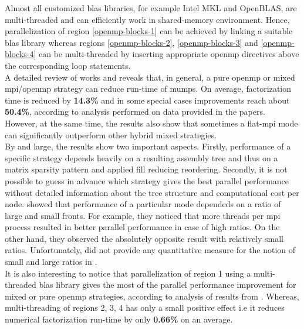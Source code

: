 Almost all customized \acrshort{blas} libraries, for example Intel MKL and OpenBLAS, are multi-threaded and can efficiently work in shared-memory environment. Hence, parallelization of region \ref{openmp-blocks-1} can be achieved by linking a suitable \acrshort{blas} library whereas regions \ref{openmp-blocks-2}, \ref{openmp-blocks-3} and \ref{openmp-blocks-4} can be multi-threaded by inserting appropriate \acrshort{openmp} directives above the corresponding loop statements.\\


A detailed review of works \cite{l2013introduction} and \cite{chowdhury2010some} reveals that, in general, a pure \acrshort{openmp} or mixed \acrshort{mpi}/\acrshort{openmp} strategy can reduce run-time of \acrshort{mumps}. On average, factorization time is reduced by \textbf{14.3\%} and in some special cases improvements reach about \textbf{50.4\%}, according to analysis performed on data provided in the papers. However, at the same time, the results also show that sometimes a flat-\acrshort{mpi} mode can significantly outperform other hybrid mixed strategies.\\


By and large, the results show two important aspects. Firstly, performance of a specific strategy depends heavily on a resulting assembly tree and thus on a matrix sparsity pattern and applied fill reducing reordering. Secondly, it is not possible to guess in advance which strategy gives the best parallel performance without detailed information about the tree structure and computational cost per node. \citeauthor{l2013introduction} showed that performance of a particular mode dependeds on a ratio of large and small fronts. For example, they noticed that more threads per \acrshort{mpi} process resulted in better parallel performance in case of high ratios. On the other hand, they observed the absolutely opposite result with relatively small ratios. Unfortunately, \citeauthor{l2013introduction} did not provide any quantitative measure for the notion of small and large ratios in  \cite{l2013introduction}.\\ 


It is also interesting to notice that parallelization of region 1 using a multi-threaded \acrshort{blas} library gives the most of the parallel performance improvement for mixed or pure \acrshort{openmp} strategies, according to analysis of results from \cite{l2013introduction}. Whereas,
multi-threading of regions 2, 3, 4 has only a small positive effect i.e it reduces numerical factorization run-time by only \textbf{0.66\%} on an average.\\



